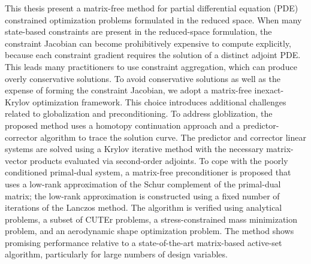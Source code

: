  
This thesis present a matrix-free method for partial differential equation (PDE)
constrained optimization problems formulated in the reduced space.  When many
state-based constraints are present in the reduced-space formulation, the
constraint Jacobian can become prohibitively expensive to compute explicitly,
because each constraint gradient requires the solution of a distinct adjoint
PDE.  This leads many practitioners to use constraint aggregation, which can
produce overly conservative solutions.  To avoid conservative solutions as well
as the expense of forming the constraint Jacobian, we adopt a matrix-free
inexact-Krylov optimization framework.  This choice introduces additional
challenges related to globalization and preconditioning.  To address
globlization, the proposed method uses a homotopy continuation approach and a
predictor-corrector algorithm to trace the solution curve.  The predictor and
corrector linear systems are solved using a Krylov iterative method with the
necessary matrix-vector products evaluated via second-order adjoints.  To cope
with the poorly conditioned primal-dual system, a matrix-free preconditioner is
proposed that uses a low-rank approximation of the Schur complement of the
primal-dual matrix; the low-rank approximation is constructed using a fixed
number of iterations of the Lanczos method. The algorithm is verified using
analytical problems, a subset of CUTEr problems, 
a stress-constrained mass minimization problem, and an aerodynamic shape optimization problem.  
The method shows promising performance relative to a state-of-the-art
matrix-based active-set algorithm, particularly for large numbers of design
variables.

